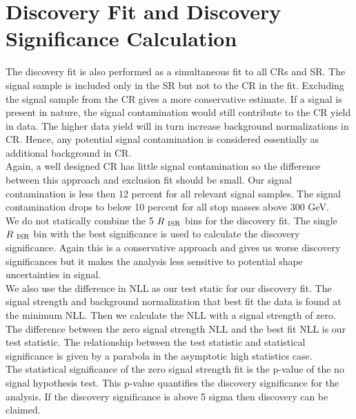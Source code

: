 \section{Discovery Fit and Discovery Significance Calculation}
\label{sec:stat:discovery}

\indent The discovery fit is also performed as a simultaneous fit to all CRs and SR.  The signal sample is included only in the SR but not to the CR in the fit.  Excluding the signal sample from the CR gives a more conservative estimate.  If a signal is present in nature, the signal contamination would still contribute to the CR yield in data.  The higher data yield will in turn increase background normalizations in CR.  Hence, any potential signal contamination is considered essentially as additional background in CR. \\

\indent  Again, a well designed CR has little signal contamination so the difference between this approach and exclusion fit should be small.  Our signal contamination is less then 12 percent for all relevant signal samples.  The signal contamination drops to below 10 percent for all stop masses above 300 GeV.  \\  

\indent We do not statically combine the 5 $R_{~\mathrm{ISR}}$ bins for the discovery fit.  The single $R_{~\mathrm{ISR}}$ bin with the best significance is used to calculate the discovery significance.  Again this is a conservative approach and gives us worse discovery significances but it makes the analysis less sensitive to potential shape uncertainties in signal.  \\

\indent We also use the difference in NLL as our test static for our discovery fit.  The signal strength and background normalization that best fit the data is found at the minimum NLL.  Then we calculate the NLL with a signal strength of zero.  The difference between the zero signal strength NLL and the best fit NLL is our test statistic.  The relationship between the test statistic and statistical significance is given by a parabola in the asymptotic high statistics case. \\%

\indent The statistical significance of the zero signal strength fit is the p-value of the no signal hypothesis test.  This p-value quantifies the discovery significance for the analysis.  If the discovery significance is above 5 sigma then discovery can be claimed.\\

